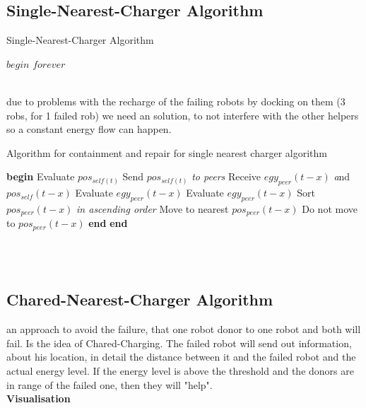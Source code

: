 \documentclass[
	a4paper,
	article,
	pagesize,
	pdftex,
	12pt,
	twoside, %
	BCOR=5mm, %
	english,
	fleqn,
	final,
	]{scrartcl}
\begin{document}
\subsection{Single-Nearest-Charger Algorithm}
\begin{algorithm}
\caption{Single-Nearest-Charger Algorithm}\label{SingleCharger}
\begin{algorithmic}[1]
	\State $begin$
	\Repeat 
	\Until $forever$
	\EndProcedure
\end{algorithmic}
\end{algorithm}
\\
due to problems with the recharge of the failing robots by docking on them (3 robs, 
for 1 failed rob) we need an solution, to not interfere with the other helpers
so a constant energy flow can happen.
\\
\begin{algorithm}
	\caption{Algorithm for containment and repair for single nearest charger
		algorithm}\label{SingleCharger}
	\begin{algorithmic}[1]
		\Procedure{}{}
		\State \textbf{begin}
		\State Evaluate $pos_{self(t)}$
		\State Send $pos_{self(t)}$ \textit {to peers}
		\State Receive $egy_{peer}(t-x)$ \textit and $pos_{self}(t-x)$ 
		 \State Evaluate $egy_{peer}(t-x)$
		  \State Evaluate $egy_{peer}(t-x)$
		  \State Sort $pos_{peer}(t-x)$ \textit {in ascending order}
		  \State Move to nearest $pos_{peer}(t-x)$
		  \Else
		  \State Do not move to $pos_{peer}(t-x)$
		 \EndIf \textbf{end}
		\EndFor \textbf{end}
		\EndProcedure
	\end{algorithmic}
\end{algorithm}
\\
\clearpage
\\
\subsection{Chared-Nearest-Charger Algorithm}
an approach to avoid the failure, that one robot donor to one robot and both will fail. Is the idea of Chared-Charging. The failed robot will send out information, about his location, in detail the distance between it and the failed robot and the actual energy level. If the energy level is above the threshold and the donors are in range of the failed one, then they will "help".
\\
\newline
\textbf{Visualisation}
\end{document}
